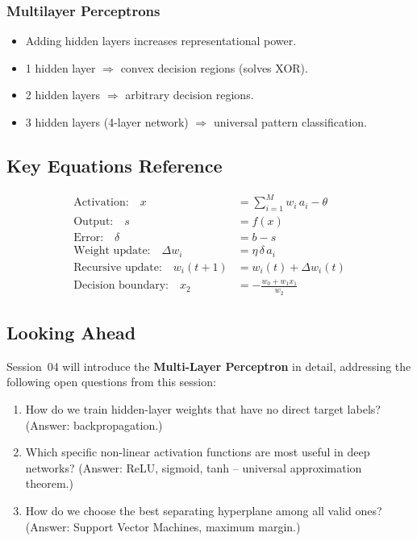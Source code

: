 \documentclass[12pt,a4paper]{article}
\begin{document}
\subsubsection*{Multilayer Perceptrons}
\begin{itemize}
  \item Adding hidden layers increases representational power.
  \item 1 hidden layer $\Rightarrow$ convex decision regions (solves XOR).
  \item 2 hidden layers $\Rightarrow$ arbitrary decision regions.
  \item 3 hidden layers (4-layer network) $\Rightarrow$ universal
        pattern classification.
\end{itemize}

\subsection{Key Equations Reference}
\label{subsec:equations}

\begin{align}
  \text{Activation:} \quad
    x &= \sum_{i=1}^{M} w_i\,a_i - \theta \tag{MP activation}\\
  \text{Output:} \quad
    s &= f(x) \tag{neuron output}\\
  \text{Error:} \quad
    \delta &= b - s \tag{Perceptron error}\\
  \text{Weight update:} \quad
    \Delta w_i &= \eta\,\delta\,a_i \tag{Perceptron rule}\\
  \text{Recursive update:} \quad
    w_i(t+1) &= w_i(t) + \Delta w_i(t) \tag{weight dynamics}\\
  \text{Decision boundary:} \quad
    x_2 &= -\frac{w_0 + w_1 x_1}{w_2} \tag{boundary line}
\end{align}

\subsection{Looking Ahead}
\label{subsec:looking-ahead}

Session~04 will introduce the \textbf{Multi-Layer Perceptron} in detail,
addressing the following open questions from this session:
\begin{enumerate}
  \item How do we train hidden-layer weights that have no direct
        target labels? (Answer: backpropagation.)
  \item Which specific non-linear activation functions are most useful
        in deep networks? (Answer: ReLU, sigmoid, tanh -- universal
        approximation theorem.)
  \item How do we choose the best separating hyperplane among all valid
        ones? (Answer: Support Vector Machines, maximum margin.)
\end{enumerate}
\end{document}

